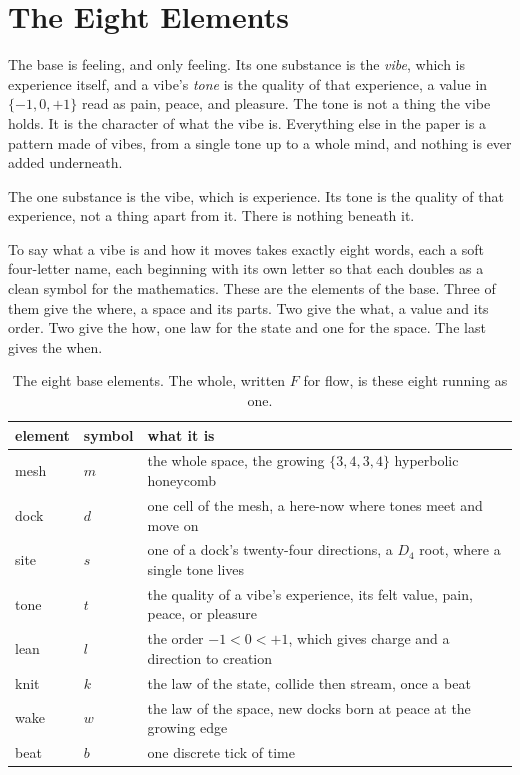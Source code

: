 \section{The Eight Elements}

The base is feeling, and only feeling. Its one substance is the \emph{vibe}, which is experience itself, and a vibe's \emph{tone} is the quality of that experience, a value in $\{-1, 0, +1\}$ read as pain, peace, and pleasure. The tone is not a thing the vibe holds. It is the character of what the vibe is. Everything else in the paper is a pattern made of vibes, from a single tone up to a whole mind, and nothing is ever added underneath.

\begin{axiom}
The one substance is the vibe, which is experience. Its tone is the quality of that experience, not a thing apart from it. There is nothing beneath it.
\end{axiom}

To say what a vibe is and how it moves takes exactly eight words, each a soft four-letter name, each beginning with its own letter so that each doubles as a clean symbol for the mathematics. These are the elements of the base. Three of them give the where, a space and its parts. Two give the what, a value and its order. Two give the how, one law for the state and one for the space. The last gives the when.

\begin{table}[ht]
\centering
\begin{tabular}{@{}llp{}@{}}
\toprule
element & symbol & what it is \\
\midrule
mesh & $m$ & the whole space, the growing $\{3,4,3,4\}$ hyperbolic honeycomb \\
dock & $d$ & one cell of the mesh, a here-now where tones meet and move on \\
site & $s$ & one of a dock's twenty-four directions, a $D_4$ root, where a single tone lives \\
tone & $t$ & the quality of a vibe's experience, its felt value, pain, peace, or pleasure \\
lean & $l$ & the order $-1 < 0 < +1$, which gives charge and a direction to creation \\
knit & $k$ & the law of the state, collide then stream, once a beat \\
wake & $w$ & the law of the space, new docks born at peace at the growing edge \\
beat & $b$ & one discrete tick of time \\
\bottomrule
\end{tabular}
\caption{The eight base elements. The whole, written $F$ for flow, is these eight running as one.}
\label{tab:atoms}
\end{table}

